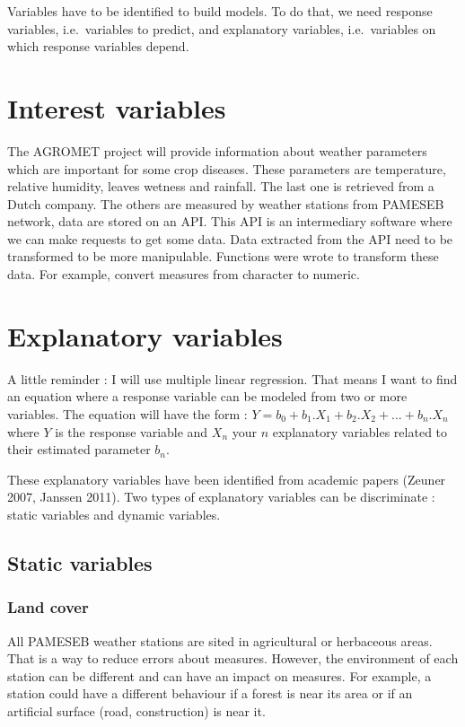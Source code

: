 \documentclass[12pt,twoside]{reedthesis}
\theoremstyle{definition}
\theoremstyle{definition}
\theoremstyle{definition}
\theoremstyle{remark}
\begin{document}
Variables have to be identified to build models. To do that, we need
response variables, i.e.~variables to predict, and explanatory
variables, i.e.~variables on which response variables depend.

\section{Interest variables}\label{interest-variables}

The AGROMET project will provide information about weather parameters
which are important for some crop diseases. These parameters are
temperature, relative humidity, leaves wetness and rainfall. The last
one is retrieved from a Dutch company. The others are measured by
weather stations from PAMESEB network, data are stored on an API. This
API is an intermediary software where we can make requests to get some
data. Data extracted from the API need to be transformed to be more
manipulable. Functions were wrote to transform these data. For example,
convert measures from character to numeric.

\section{Explanatory variables}\label{explanatory-variables}

A little reminder : I will use multiple linear regression. That means I
want to find an equation where a response variable can be modeled from
two or more variables. The equation will have the form :
\(Y = b_0 + b_1.X_1 + b_2.X_2 + ... + b_n.X_n\) where \(Y\) is the
response variable and \(X_n\) your \(n\) explanatory variables related
to their estimated parameter \(b_n\).

These explanatory variables have been identified from academic papers
(Zeuner 2007, Janssen 2011). Two types of explanatory variables can be
discriminate : static variables and dynamic variables.

\subsection{Static variables}\label{static-variables}

\subsubsection{Land cover}\label{land-cover}

All PAMESEB weather stations are sited in agricultural or herbaceous
areas. That is a way to reduce errors about measures. However, the
environment of each station can be different and can have an impact on
measures. For example, a station could have a different behaviour if a
forest is near its area or if an artificial surface (road, construction)
is near it.
\end{document}
